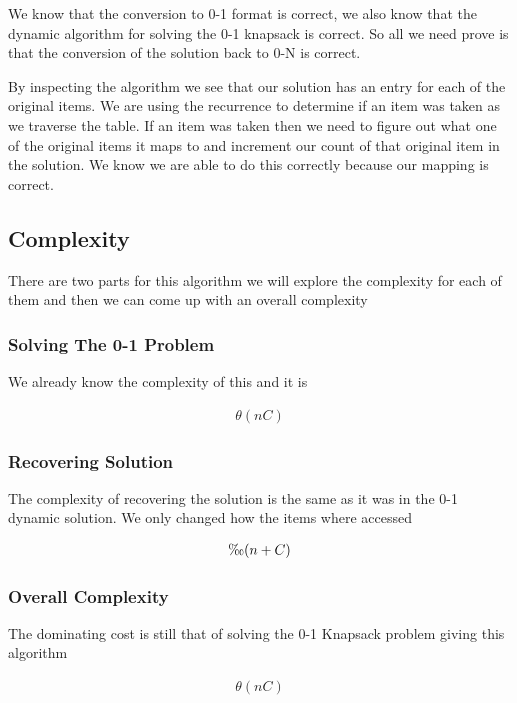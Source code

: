\documentclass{article}
\begin{document}
			We know that the conversion to 0-1 format is correct, we also know that the dynamic algorithm for solving the 0-1 knapsack is correct. So all we need prove is that the conversion of the solution back to 0-N is correct.\newline
			
			By inspecting the algorithm we see that our solution has an entry for each of the original items. We are using the recurrence to determine if an item was taken as we traverse the table. If an item was taken then we need to figure out what one of the original items it maps to and increment our count of that original item in the solution. We know we are able to do this correctly because our mapping is correct. 
		\subsection{Complexity}
		There are two parts for this algorithm we will explore the complexity for each of them and then we can come up with an overall complexity
			
		\subsubsection{Solving The 0-1 Problem}
			We already know the complexity of this and it is
		
			\begin{align}
				\theta(nC)
			\end{align}
		
		\subsubsection{Recovering Solution}
			The complexity of recovering the solution is the same as it was in the 0-1 dynamic solution. We only changed how the items where accessed
			
			\begin{align}
				\O(n + C)
			\end{align}
		
		\subsubsection{Overall Complexity}
			The dominating cost is still that  of solving the 0-1 Knapsack problem giving this algorithm
			
			\begin{align}
				\theta(nC)
			\end{align}
			
\end{document}
